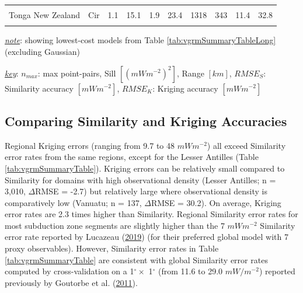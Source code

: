 \begin{table}
{\begin{threeparttable}
\begin{tabular}[t]{llrrrrrrrr}
\cellcolor{gray!6}{Sumatra Banda Sea} & \cellcolor{gray!6}{Exp} & \cellcolor{gray!6}{1.0} & \cellcolor{gray!6}{23.9} & \cellcolor{gray!6}{1.6} & \cellcolor{gray!6}{33.0} & \cellcolor{gray!6}{2276} & \cellcolor{gray!6}{342} & \cellcolor{gray!6}{9.5} & \cellcolor{gray!6}{20.8}\\
Tonga New Zealand & Cir & 1.1 & 15.1 & 1.9 & 23.4 & 1318 & 343 & 11.4 & 32.8\\
\cellcolor{gray!6}{Vanuatu} & \cellcolor{gray!6}{Lin} & \cellcolor{gray!6}{1.4} & \cellcolor{gray!6}{15.3} & \cellcolor{gray!6}{1.6} & \cellcolor{gray!6}{10.1} & \cellcolor{gray!6}{3033} & \cellcolor{gray!6}{286} & \cellcolor{gray!6}{17.8} & \cellcolor{gray!6}{48.0}\\
\bottomrule
\end{tabular}
\begin{tablenotes}
\item \uline{\textit{note}}: showing lowest-cost models from Table \ref{tab:vgrmSummaryTableLong} (excluding Gaussian)
\item \uline{\textit{key}}: $n_{max}$: max point-pairs, Sill $[(mWm^{-2})^2]$, Range $[km]$, $RMSE_S$: Similarity accuracy $[mWm^{-2}]$, $RMSE_K$: Kriging accuracy $[mWm^{-2}]$
\end{tablenotes}
\end{threeparttable}}
\end{table}

\hypertarget{comparing-similarity-and-kriging-accuracies}{%
\subsection{Comparing Similarity and Kriging Accuracies}\label{comparing-similarity-and-kriging-accuracies}}

Regional Kriging errors (ranging from 9.7 to 48 \(mWm^{-2}\)) all exceed Similarity error rates from the same regions, except for the Lesser Antilles (Table \ref{tab:vgrmSummaryTable}). Kriging errors can be relatively small compared to Similarity for domains with high observational density (Lesser Antilles; n = 3,010, \(\Delta\)RMSE = -2.7) but relatively large where observational density is comparatively low (Vanuatu; n = 137, \(\Delta\)RMSE = 30.2). On average, Kriging error rates are 2.3 times higher than Similarity. Regional Similarity error rates for most subduction zone segments are slightly higher than the 7 \(mWm^{-2}\) Similarity error rate reported by Lucazeau (\protect\hyperlink{ref-lucazeau2019}{2019}) (for their preferred global model with 7 proxy observables). However, Similarity error rates in Table \ref{tab:vgrmSummaryTable} are consistent with global Similarity error rates computed by cross-validation on a 1\(^\circ \times\) 1\(^\circ\) (from 11.6 to 29.0 \(mW/m^{-2}\)) reported previously by Goutorbe et al. (\protect\hyperlink{ref-goutorbe2011}{2011}).

